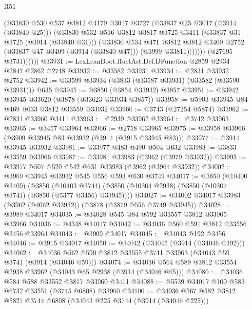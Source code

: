 \begin{lexlean}{R51}
\begin{coremodule}
                    (@33830
                      @530
                      @537
                      @3812
                      @4179
                      @3017
                      @3727
                      (@33837 @25 @3017 (@3914 (@33840 @25)))
                      (@33830
                        @532
                        @536
                        @3812
                        @3817
                        @3725
                        @3411
                        (@33837 @31 @3725 (@3914 (@33840 @31)))
                        (@33830
                          @534
                          @471
                          @3812
                          @3812
                          @3409
                          @2752
                          (@33837 @47 @3409 (@3914 (@33840 @47)))
                          (@3999 @33811)))))))
              (@27695 @3731))))))
@33931 := LexLeanBoot.RustAst.Def.DFunction @2859 @2934 @2847 @2862 @2748
@33932 := @33582 @33931
@33934 := @2831 @33932 @2752
@33942 := @33599 @33934 (@3833 (@33587 @33931) (@33582 (@33590 @33931))) @635
@33945 := @3850 (@3854 @33932) @3857
@33951 := @33942 @33945 @33620 (@3878 (@33623 @33934 @3857))
@33958 := @5903 @33945 @84 @469 @633 @3812 @33559 @33932
@33960 := @3743 (@27254 @5874)
@33962 := @2831 @33960 @3411
@33963 := @2939 @33962
@33964 := @3742 @33963
@33965 := @3457 @33964
@33966 := @2758 @33965
@33975 := @33958 @33966 (@3909 @33945 @83 @33932 (@3914 (@3915 @33945 @83)))
@33977 := @3944 @33945 @33932
@33981 := @33977 @483 @490 @504 @632
@33983 := @3833 @33559 @33966
@33987 := @33981 @33983 (@3962 (@3979 @33932))
@33995 := @33977 @507 @520 @542 @631 @33983 (@3962 (@3964 @33932))
@34002 := @3969 @33945 @33932 @545 @556 @593 @630 @3749
@34017 := @3850
    (@10400 @3409)
    (@3850
      (@10403 @3744)
      (@3850 (@10304 @2938) (@3850 (@10307 @3741) (@3850 (@5377 @3456) @33945))))
@34027 := @34002 @34017 @33983 (@3962 (@4062 @33932)) (@3878 (@3879 @556 @3749 @33945))
@34028 := @3989 @34017
@34035 := @34028 @545 @84 @592 @33557 @3812 @33965 @33966
@34036 := @4348 @34017
@34042 := @34036 @560 @591 @3812 @33556 @3456 @33964
@34043 := @3909 @34017
@34045 := @34043 @192 @3456
@34046 := @3915 @34017
@34050 := @34042 (@34045 (@3914 (@34046 @192)))
@34062 := @34036 @562 @590 @3812 @33555 @3741 @33963 (@34043 @59 @3741 (@3914 (@34046 @59)))
@34074 := @34036 @564 @589 @3812 @33554 @2938 @33962 (@34043 @65 @2938 (@3914 (@34046 @65)))
@34080 := @34036 @584 @588 @33552 @3817 @33960 @3411
@34088 := @5539 @34017 @100 @583 @6732 @33551 (@3745 @6808) @33960
@34100 := @34036 @567 @582 @3812 @5827 @3744 @6808 (@34043 @225 @3744 (@3914 (@34046 @225)))

\end{coremodule}
\end{lexlean}
